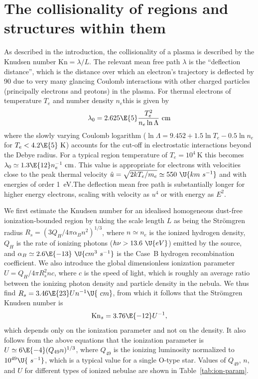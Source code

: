 \documentclass{emulateapj}
\newcommand\Kn{\ensuremath{\mathrm{Kn}}}
\newcommand\kms{\U{km\ s^{-1}}}
\newcommand\hii{\ion{H}{2}}
\newcommand\ubar{\ensuremath{\hat{u}}}
\begin{document}
\section{The collisionality of \hii{} regions and structures within
  them}
\label{sec:coll-hii-regi}

As described in the introduction, the collisionality of a plasma is
described by the Knudsen number \(\Kn = \lambda/ L\).
The relevant mean free path \(\lambda\)
is the ``deflection distance'', which is the distance over which an
electron's trajectory is deflected by 90\arcdeg{} due to very many
glancing Coulomb interactions with other charged particles
(principally electrons and protons) in the plasma.  For thermal
electrons of temperature \(T_{e}\)
and number density \(n_{e}\)this is given by
\begin{equation}
  \lambda_0 = 2.625\E{5} \frac{T_{e}^2}{n_{e} \ln\Lambda}\ \mathrm{cm}
  \label{eq:4}
\end{equation}
where the slowly varying Coulomb logarithm
(\(\ln\Lambda = 9.452 + 1.5 \ln T_{e} - 0.5 \ln n_{e} \)
for \(T_{e} < 4.2\E{5}\mathrm{\ K}\))
accounts for the cut-off in electrostatic interactions beyond the
Debye radius.  For a typical \hii{} region temperature of
\(T_{e} = 10^4 \mathrm{\ K}\)
this becomes \(\lambda_0 \simeq 1.3\E{12} n_{e}^{-1} \mathrm{\ cm}\).
This value is appropriate for electrons with velocities close to the
peak thermal velocity
\(\ubar = \sqrt{2 k T_{e}/m_{e}} \simeq 550~\kms\)
and with energies of order 1~eV.\@ The deflection mean free path is
substantially longer for higher energy electrons, scaling with
velocity as \(u^4\) or with energy as \(E^2\).  

We first estimate the Knudsen number for an idealised homogeneous
dust-free ionization-bounded \hii{} region by taking the scale length
\(L\)
as being the Strömgren radius
\(R_{s} = (3 Q_{H} / 4 \pi \alpha_{B} n^2)^{1/3}\),
where \(n \simeq n_{e}\)
is the ionized hydrogen density, \(Q_{H}\)
is the rate of ionizing photons (\(h\nu > 13.6~\U{eV}\))
emitted by the source, and
\(\alpha_{B} \simeq 2.6\E{-13}~\U{cm^3\ s^{-1}}\)
is the Case~B hydrogen recombination coefficient.  We also introduce
the global dimensionless ionization parameter
\(U = Q_{H} / 4 \pi R_{s}^2 n c\),
where \(c\)
is the speed of light, which is roughly an average ratio between the
ionizing photon density and particle density in the nebula.  We thus
find \(R_{s} = 3.46 \E{23} U n^{-1} \U{\ cm}\),
from which it follows that the Strömgren Knudsen number is
\[\Kn_{s} = 3.76\E{-12} U^{-1} ,\]
which depends only on the ionization parameter and not on the density.
It also follows from the above equations that the ionization parameter
is \(U \simeq 6\E{-4} (Q_{49} n)^{1/3}\),
where \(Q_{49}\)
is the ionizing luminosity normalized to \(10^{49}\U{\ s^{-1}}\),
which is a typical value for a single O-type star.  Values of
\(Q_{49}\), \(n\), and \(U\) for different types of ionized nebulae
are shown in Table~\ref{tab:ion-param}.  
\end{document}
